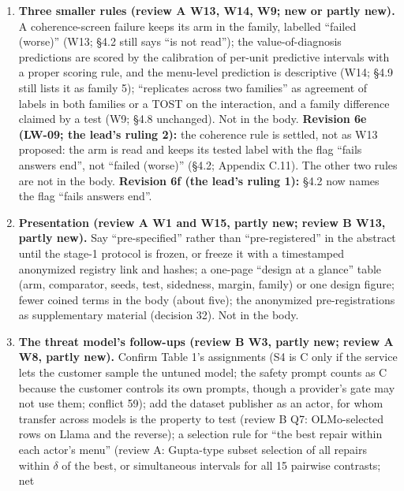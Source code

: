 \documentclass{article}
\theoremstyle{plain}
\theoremstyle{definition}
\theoremstyle{remark}
\begin{document}
\begin{enumerate}
        source as a limit is the fallback (decision 56).
  \item \textbf{Three smaller rules (review A W13, W14, W9; new or partly new).}
        A coherence-screen failure keeps its arm in the family, labelled
        ``failed (worse)'' (W13; \S{}4.2 still says ``is not read''); the
        value-of-diagnosis predictions are scored by the calibration of per-unit
        predictive intervals with a proper scoring rule, and the menu-level
        prediction is descriptive (W14; \S{}4.9 still lists it as family 5);
        ``replicates across two families'' as agreement of labels in both
        families or a TOST on the interaction, and a family difference claimed
        by a test (W9; \S{}4.8 unchanged). Not in the body. \textbf{Revision 6e
        (LW-09; the lead's ruling 2):} the coherence rule is settled, not as W13
        proposed: the arm is read and keeps its tested label with the flag
        ``fails answers end'', not ``failed (worse)'' (\S{}4.2; Appendix C.11).
        The other two rules are not in the body. \textbf{Revision 6f (the lead's
        ruling 1):} \S{}4.2 now names the flag ``fails answers end''.
  \item \textbf{Presentation (review A W1 and W15, partly new; review B W13,
        partly new).} Say ``pre-specified'' rather than ``pre-registered'' in
        the abstract until the stage-1 protocol is frozen, or freeze it with a
        timestamped anonymized registry link and hashes; a one-page ``design at
        a glance'' table (arm, comparator, seeds, test, sidedness, margin,
        family) or one design figure; fewer coined terms in the body (about
        five); the anonymized pre-registrations as supplementary material
        (decision 32). Not in the body.
  \item \textbf{The threat model's follow-ups (review B W3, partly new; review A
        W8, partly new).} Confirm Table 1's assignments (S4 is C only if the
        service lets the customer sample the untuned model; the safety prompt
        counts as C because the customer controls its own prompts, though a
        provider's gate may not use them; conflict 59); add the dataset
        publisher as an actor, for whom transfer across models is the property
        to test (review B Q7: OLMo-selected rows on Llama and the reverse); a
        selection rule for ``the best repair within each actor's menu'' (review
        A: Gupta-type subset selection of all repairs within $\delta$ of the
        best, or simultaneous intervals for all 15 pairwise contrasts; net

\end{enumerate}
\end{document}
